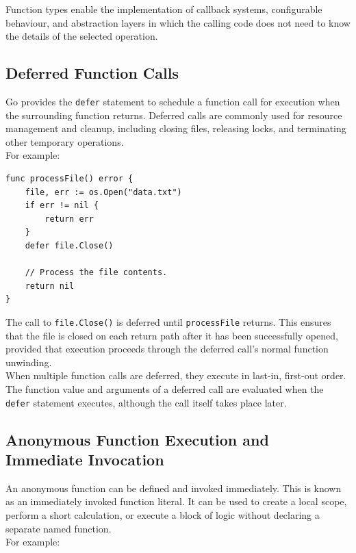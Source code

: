 Function types enable the implementation of callback systems, configurable behaviour, and abstraction layers in which the calling code does not need to know the details of the selected operation.

\subsection{Deferred Function Calls}

Go provides the \texttt{defer} statement to schedule a function call for execution when the surrounding function returns. Deferred calls are commonly used for resource management and cleanup, including closing files, releasing locks, and terminating other temporary operations.\\

For example:

\begin{lstlisting}
func processFile() error {
    file, err := os.Open("data.txt")
    if err != nil {
        return err
    }
    defer file.Close()

    // Process the file contents.
    return nil
}
\end{lstlisting}

The call to \texttt{file.Close()} is deferred until \texttt{processFile} returns. This ensures that the file is closed on each return path after it has been successfully opened, provided that execution proceeds through the deferred call's normal function unwinding.\\

When multiple function calls are deferred, they execute in last-in, first-out order. The function value and arguments of a deferred call are evaluated when the \texttt{defer} statement executes, although the call itself takes place later.\\

\subsection{Anonymous Function Execution and Immediate Invocation}

An anonymous function can be defined and invoked immediately. This is known as an immediately invoked function literal. It can be used to create a local scope, perform a short calculation, or execute a block of logic without declaring a separate named function.\\

For example:

